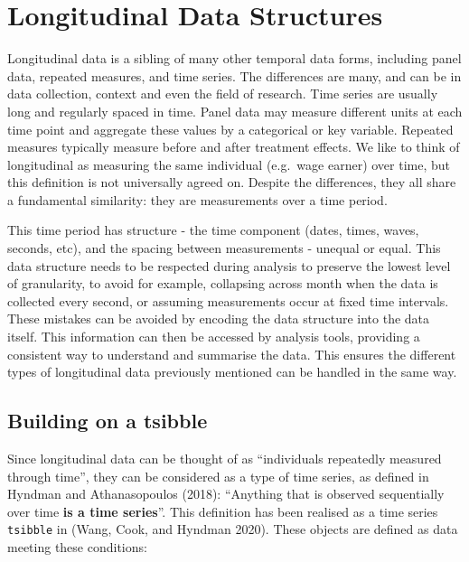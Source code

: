 \hypertarget{longitudinal-data-structures}{%
\section{Longitudinal Data Structures}\label{longitudinal-data-structures}}

Longitudinal data is a sibling of many other temporal data forms, including panel data, repeated measures, and time series. The differences are many, and can be in data collection, context and even the field of research. Time series are usually long and regularly spaced in time. Panel data may measure different units at each time point and aggregate these values by a categorical or key variable. Repeated measures typically measure before and after treatment effects. We like to think of longitudinal as measuring the same individual (e.g.~wage earner) over time, but this definition is not universally agreed on. Despite the differences, they all share a fundamental similarity: they are measurements over a time period.

This time period has structure - the time component (dates, times, waves, seconds, etc), and the spacing between measurements - unequal or equal. This data structure needs to be respected during analysis to preserve the lowest level of granularity, to avoid for example, collapsing across month when the data is collected every second, or assuming measurements occur at fixed time intervals. These mistakes can be avoided by encoding the data structure into the data itself. This information can then be accessed by analysis tools, providing a consistent way to understand and summarise the data. This ensures the different types of longitudinal data previously mentioned can be handled in the same way.

\hypertarget{building-on-a-tsibble}{%
\subsection{Building on a tsibble}\label{building-on-a-tsibble}}

Since longitudinal data can be thought of as ``individuals repeatedly measured through time'', they can be considered as a type of time series, as defined in Hyndman and Athanasopoulos (2018): ``Anything that is observed sequentially over time \textbf{is a time series}''. This definition has been realised as a time series \texttt{tsibble} in (Wang, Cook, and Hyndman 2020). These objects are defined as data meeting these conditions:

